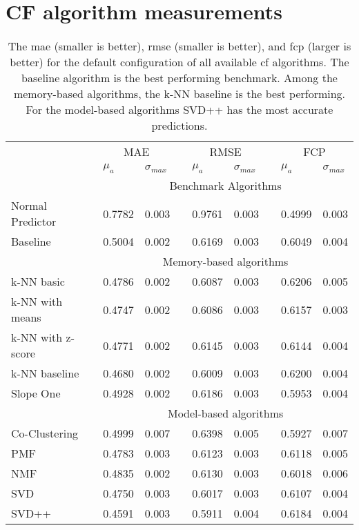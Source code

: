 \chapter{CF algorithm measurements}
\label{app:its-metrics}

\begin{sidewaystable}
    \centering
    \caption[Comparison of default configurations for all CF algorithms]{The \gls{mae} (smaller is better), \gls{rmse} (smaller is better), and \gls{fcp} (larger is better) for the default configuration of all available \gls{cf} algorithms. The baseline algorithm is the best performing benchmark. Among the memory-based algorithms, the k-NN baseline is the best performing. For the model-based algorithms SVD++ has the most accurate predictions.}
    \begin{tabular}{l ll l ll l ll}
                 & \multicolumn{2}{c}{MAE} &&
                 \multicolumn{2}{c}{RMSE} &&
                 \multicolumn{2}{c}{FCP} \\
    \cline{2-3} \cline{5-6} \cline{8-9}
    & $\mu_a$ & $\sigma_{max}$ && $\mu_a$ & $\sigma_{max}$ && $\mu_a$ & $\sigma_{max}$ \\
    \hline
    &\multicolumn{8}{c}{\textsf{Benchmark Algorithms}}\\
    \hline
    Normal Predictor & 0.7782 & 0.003 && 0.9761 & 0.003 && 0.4999 & 0.003\\
    Baseline         &  \textcolor{scw-teal-darker}{0.5004} & 0.002 && 0.6169 & 0.003 && 0.6049 & 0.004\\
    \hline
    &\multicolumn{8}{c}{\textsf{Memory-based algorithms}}\\
    \hline
    k-NN basic       & 0.4786 & 0.002 && 0.6087 & 0.003 && 0.6206 & 0.005\\
    k-NN with means  & 0.4747 & 0.002 && 0.6086 & 0.003 && 0.6157 & 0.003\\
    k-NN with z-score& 0.4771 & 0.002 && 0.6145 & 0.003 && 0.6144 & 0.004\\
    k-NN baseline    & \textcolor{scw-teal-darker}{0.4680} & 0.002 && 0.6009 & 0.003 && 0.6200 & 0.004\\
    Slope One        & 0.4928 & 0.002 && 0.6186 & 0.003 && 0.5953 & 0.004\\
    \hline
    &\multicolumn{8}{c}{\textsf{Model-based algorithms}}\\
    \hline
    Co-Clustering    & 0.4999 & 0.007 && 0.6398 & 0.005 && 0.5927 & 0.007\\
    PMF              & 0.4783 & 0.003 && 0.6123 & 0.003 && 0.6118 & 0.005 \\
    NMF              & 0.4835 & 0.002 && 0.6130 & 0.003 && 0.6018 & 0.006 \\
    SVD              & 0.4750 & 0.003 && 0.6017 & 0.003 && 0.6107 & 0.004 \\
    SVD++            & \textcolor{scw-teal-darker}{0.4591} & 0.003 && 0.5911 & 0.004 && 0.6184 & 0.004 \\
    \end{tabular}
\end{sidewaystable}

